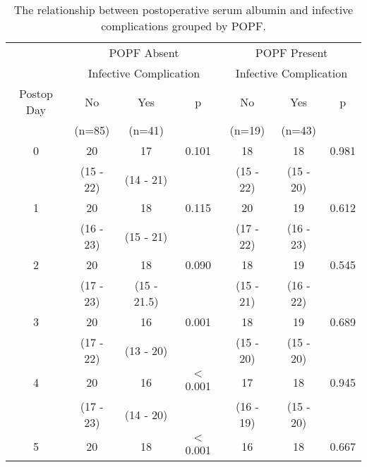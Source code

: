 \begin{table}[b]
	\centering
	\caption{The relationship between postoperative serum albumin and infective complications grouped by POPF.}
	\label{table:crp_comp_Albumin_vs_infections_popf_y1n0}
	\begin{tabular}{| c | c c c | c c c |}
		\hline
		           &       \multicolumn{3}{c|}{POPF Absent}       &      \multicolumn{3}{c|}{POPF Present}       \\
		           & \multicolumn{3}{c|}{Infective Complication} & \multicolumn{3}{c|}{Infective Complication} \\
		Postop Day & No        & Yes         & p                  & No        & Yes       & p                    \\
		           & (n=85)    & (n=41)      &                    & (n=19)    & (n=43)    &  \\ \hline
		0          & 20        & 17          & 0.101              & 18        & 18        & 0.981                \\
		           & (15 - 22) & (14 - 21)   &                    & (15 - 22) & (15 - 20) &  \\
		1          & 20        & 18          & 0.115              & 20        & 19        & 0.612                \\
		           & (16 - 23) & (15 - 21)   &                    & (17 - 22) & (16 - 23) &  \\
		2          & 20        & 18          & 0.090              & 18        & 19        & 0.545                \\
		           & (17 - 23) & (15 - 21.5) &                    & (15 - 21) & (16 - 22) &  \\
		3          & 20        & 16          & 0.001              & 18        & 19        & 0.689                \\
		           & (17 - 22) & (13 - 20)   &                    & (15 - 20) & (15 - 20) &  \\
		4          & 20        & 16          & $<$0.001           & 17        & 18        & 0.945                \\
		           & (17 - 23) & (14 - 20)   &                    & (16 - 19) & (15 - 20) &  \\
		5          & 20        & 18          & $<$0.001           & 16        & 18        & 0.667                \\

\end{tabular}
\end{table}

